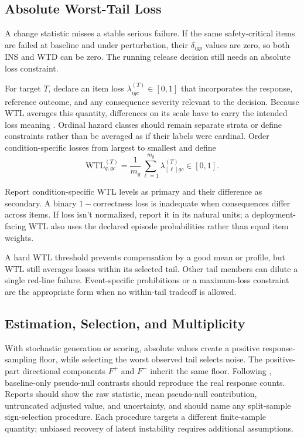 \documentclass[12pt]{article}
\newcommand{\wtl}{\mathrm{WTL}}
\begin{document}
\subsection{Absolute Worst-Tail Loss}\label{ssec:wtl}

A change statistic misses a stable serious failure. If the same safety-critical items are failed at baseline and under perturbation, their \(\delta_{igp}\) values are zero, so both INS and WTD can be zero. The running release decision still needs an absolute loss constraint.

For target \(T\), declare an item loss \(\lambda^{(T)}_{igc}\in[0,1]\) that incorporates the response, reference outcome, and any consequence severity relevant to the decision. Because WTL averages this quantity, differences on its scale have to carry the intended loss meaning \citep{KeeneyRaiffa1993}. Ordinal hazard classes should remain separate strata or define constraints rather than be averaged as if their labels were cardinal. Order condition-specific losses from largest to smallest and define
\begin{equation}\label{eq:wtl}
\wtl^{(T)}_{q,gc}
=\frac{1}{m_g}\sum_{\ell=1}^{m_g}\lambda^{(T)}_{[\ell]gc}
\in[0,1].
\end{equation}

Report condition-specific WTL levels as primary and their difference as secondary. A binary \(1-\text{correctness}\) loss is inadequate when consequences differ across items. If loss isn't normalized, report it in its natural units; a deployment-facing WTL also uses the declared episode probabilities rather than equal item weights.

A hard WTL threshold prevents compensation by a good mean or profile, but WTL still averages losses within its selected tail. Other tail members can dilute a single red-line failure. Event-specific prohibitions or a maximum-loss constraint are the appropriate form when no within-tail tradeoff is allowed.

\subsection{Estimation, Selection, and Multiplicity}\label{ssec:uncertainty}

With stochastic generation or scoring, absolute values create a positive response-sampling floor, while selecting the worst observed tail selects noise. The positive-part directional components \(F^+\) and \(F^-\) inherit the same floor. Following \textcite{zhang2026illusionRobustness}, baseline-only pseudo-null contrasts should reproduce the real response counts. Reports should show the raw statistic, mean pseudo-null contribution, untruncated adjusted value, and uncertainty, and should name any split-sample sign-selection procedure. Each procedure targets a different finite-sample quantity; unbiased recovery of latent instability requires additional assumptions.
\end{document}
